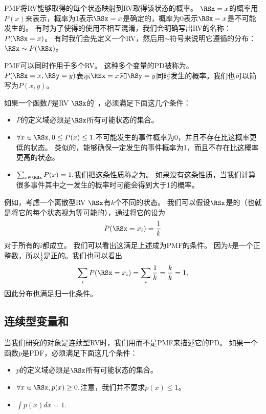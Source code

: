 
\gls{PMF}将\gls{RV}能够取得的每个状态映射到\gls{RV}取得该状态的概率。
$\RSx = x$的概率用$P(x)$来表示，概率为1表示$\RSx = x$是确定的，概率为0表示$\RSx=x$是不可能发生的。
有时为了使得的使用不相互混淆，我们会明确写出\gls{RV}的名称：$P(\RSx = x)$。
有时我们会先定义一个\gls{RV}，然后用$\sim$符号来说明它遵循的分布：$\RSx\sim P(\RSx)$。

\gls{PMF}可以同时作用于多个\gls{RV}。
这种多个变量的\gls{PD}被称为。
$P(\RSx = x, \RSy = y)$表示$\RSx = x$和$\RSy = y$同时发生的概率。我们也可以简写为$P(x, y)$。

如果一个函数$P$是\gls{RV} $\RSx$的~，必须满足下面这几个条件：
\begin{itemize}
\item $P$的定义域必须是$\RSx$所有可能状态的集合。

\item $\forall x \in \RSx, 0\le P(x)\le 1.$不可能发生的事件概率为0，并且不存在比这概率更低的状态。
类似的，能够确保一定发生的事件概率为1，而且不存在比这概率更高的状态。

\item $\sum_{x \in \RSx} P(x) = 1.$我们把这条性质称之为。
如果没有这条性质，当我们计算很多事件其中之一发生的概率时可能会得到大于1的概率。
\end{itemize}

例如，考虑一个离散型\gls{RV} $\RSx$有$k$个不同的状态。
我们可以假设$\RSx$是的（也就是将它的每个状态视为等可能的），通过将它的设为
\begin{equation}
P(\RSx = x_i) = \frac{1}{k}
\end{equation}
对于所有的$i$都成立。
我们可以看出这满足上述成为\gls{PMF}的条件。
因为$k$是一个正整数，所以$\frac{1}{k}$是正的。我们也可以看出
\begin{equation}
\sum_i P(\RSx = x_i) = \sum_i \frac{1}{k} = \frac{k}{k} = 1,
\end{equation}
因此分布也满足归一化条件。


\subsection{连续型变量和}
\label{sec:continuous_variables_and_probability_density_functions}

当我们研究的对象是连续型\gls{RV}时，我们用而不是\gls{PMF}来描述它的\gls{PD}。
如果一个函数$p$是\gls{PDF}，必须满足下面这几个条件：
\begin{itemize}
\item $p$的定义域必须是$\RSx$所有可能状态的集合。

\item $\forall x \in \RSx, p(x)\ge 0.$注意，我们并不要求$p(x)\le 1$。

\item $\int p(x) dx = 1.$
\end{itemize}

